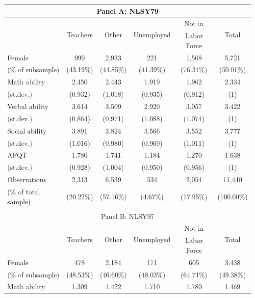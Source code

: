\documentclass[onehalfspacing,11pt]{article}
\begin{document}
	\begin{table}[h!]
		\centering
		\begin{tabular}{lccccc}
			\toprule
			\multicolumn{6}{c}{Panel A: NLSY79}\\
			\midrule
			& \multirow{2}{*}{Teachers} & \multirow{2}{*}{Other} & \multirow{2}{*}{Unemployed} & Not in & \multirow{2}{*}{Total}\\
			& &  &  & Labor Force & \\
			\midrule
			Female & 999 & 2,933 & 221 & 1,568 & 5,721\\
			\quad (\% of subsample) & (43.19\%) & (44.85\%) & (41.39\%) & (76.34\%) & (50.01\%)\\
			\midrule
			Math ability & 2.450 & 2.443 & 1.919 & 1.962 & 2.334\\
			\quad (st.dev.) & (0.932) & (1.018) & (0.935) & (0.912) & (1)\\
			\midrule
			Verbal ability & 3.614 & 3.509 & 2.920 & 3.057 &  3.422\\
			\quad (st.dev.) & (0.864) & (0.971) & (1.088) & (1.074) & (1)\\
			\midrule
			Social ability & 3.891 & 3.824 & 3.566 & 3.552 & 3.777\\
			\quad (st.dev.) & (1.016) & (0.980) & (0.969) & (1.011) & (1)\\
			\midrule
			AFQT & 1.780 &  1.741 & 1.184 & 1.270 & 1.638\\
			\quad (st.dev.) & (0.928) & (1.004) & (0.950) & (0.956) & (1)\\
			\midrule
			Observations &  2,313 & 6,539 &  534 & 2,054 & 11,440\\
			\quad (\% of total sample) & (20.22\%) & (57.16\%) & (4.67\%) & (17.95\%) & (100.00\%)\\
			\bottomrule
			\\
			\toprule
			\multicolumn{6}{c}{Panel B: NLSY97}\\
			\midrule
			& \multirow{2}{*}{Teachers} & \multirow{2}{*}{Other} & \multirow{2}{*}{Unemployed} & Not in & \multirow{2}{*}{Total}\\
			& &  &  & Labor Force & \\
			\midrule
			Female & 478 & 2,184 & 171 & 605 & 3,438\\
			\quad (\% of subsample) & (48.53\%) & (46.60\%) & (48.03\%) & (64.71\%) & (49.38\%)\\
			\midrule
			Math ability & 1.309 & 1.422 & 1.710 & 1.780 & 1.469\\

\end{tabular}
\end{table}
\end{document}

